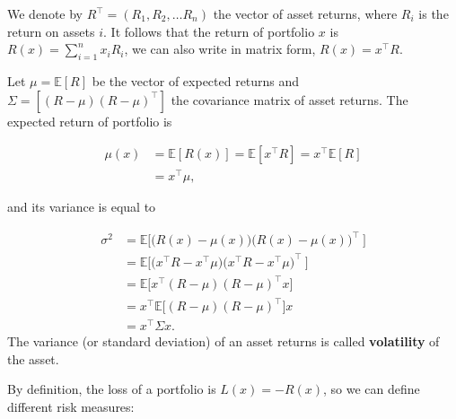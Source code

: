 We denote by $R^\top = (R_1, R_2, \dots R_n)$ the vector of asset returns, where $R_i$ is the return on assets $i$. It follows that the return of portfolio $x$ is $R(x) = \sum_{i=1}^n x_i R_i$, we can also write in matrix form, $R(x) = x^\top R$.

Let $\mu = \mathbb{E}[R]$ be the vector of expected returns and $\Sigma = [(R-\mu)(R-\mu)^\top]$ the covariance matrix of asset returns. The expected return of portfolio is

\[
	\begin{aligned}
		\mu(x) & = \mathbb{E}[R(x)]=\mathbb{E}[x^\top R] = x^\top \mathbb{E}[R] \\
		       & = x^\top \mu,
	\end{aligned}
\]

and its variance is equal to

\[
	\begin{aligned}
		\sigma^2 & = \mathbb{E}\Big[\Big(R(x)-\mu(x)\Big)\Big(R(x)-\mu(x)\Big)^\top\ \Big]                        \\
		         & = \mathbb{E}\Big[\Big(x^\top R - x^\top \mu \Big)\Big(x^\top R - x^\top \mu \Big)^\top \ \Big] \\
		         & = \mathbb{E}\Big[x^\top(R-\mu)(R-\mu)^\top x \Big]                                             \\
		         & = x^\top \mathbb{E}\Big[(R-\mu)(R-\mu)^\top \Big] x                                            \\
		         & = x^\top \Sigma x.
	\end{aligned}
\]
The variance (or standard deviation) of an asset returns is called \textbf{volatility} of the asset.

By definition, the loss of a portfolio is $L(x) = -R(x)$, so we can define different risk measures:

